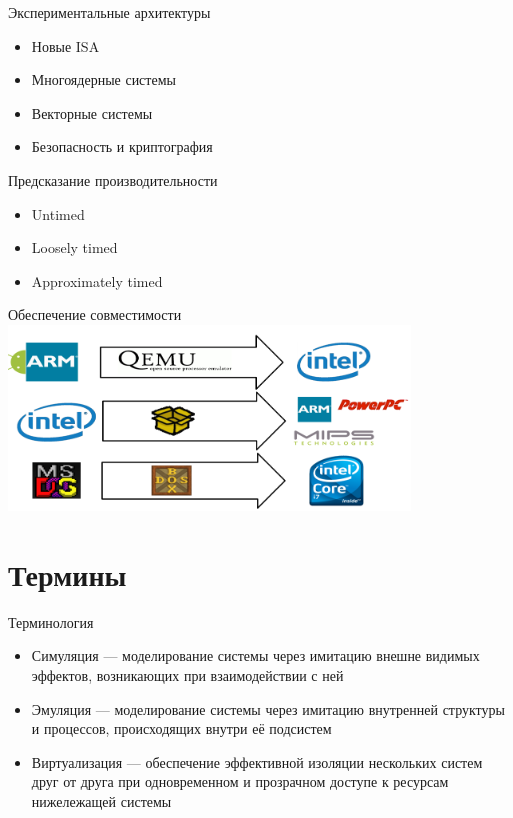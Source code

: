 \documentclass{beamer}
\begin{document}
\begin{frame}{Экспериментальные архитектуры}

\begin{itemize}
\item Новые ISA
\item Многоядерные системы
\item Векторные системы
\item Безопасность и криптография
\end{itemize}

\end{frame}

\begin{frame}{Предсказание производительности}

\begin{itemize}
\item Untimed
\item Loosely timed
\item Approximately timed
\end{itemize}

\end{frame}


\begin{frame}{Обеспечение совместимости}
\includegraphics[width=0.8\textwidth]{compat} %

\end{frame}

\section{Термины}

\begin{frame}{Терминология}
\begin{itemize}
\item Симуляция — моделирование системы через имитацию внешне видимых эффектов, возникающих при взаимодействии с ней
\item Эмуляция — моделирование системы через имитацию внутренней структуры и процессов, происходящих внутри её подсистем
\item Виртуализация — обеспечение эффективной изоляции нескольких систем друг от друга при одновременном и прозрачном доступе к ресурсам нижележащей системы
\end{itemize}

\end{frame}
\end{document}
